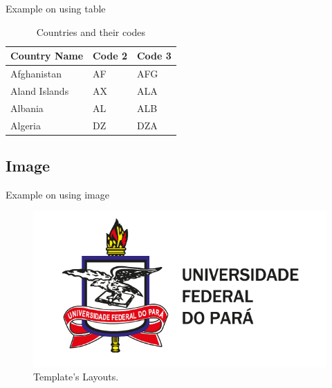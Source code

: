 \documentclass[aspectratio=169,t,xcolor=table]{beamer}
\begin{document}
    \begin{frame}{Example on using table}

        \begin{table}[]
            \centering
            \caption{\label{tab:1}Countries and their codes}

            \renewcommand{\arraystretch}{1.5}
            \setlength{\tabcolsep}{10pt}

            {
                \begin{tabular}{ p{3cm}p{3cm}p{3cm}  }
                    \toprule
                    \textbf{Country Name} & \textbf{Code 2} & \textbf{Code 3} \\
                    \midrule
                    Afghanistan           & AF              & AFG             \\
                    Aland Islands         & AX              & ALA             \\
                    Albania               & AL              & ALB             \\
                    Algeria               & DZ              & DZA             \\
                    \bottomrule
                \end{tabular}
            }
        \end{table}

    \end{frame}

    \subsection{Image}

    \begin{frame}{Example on using image}

        \begin{figure}
            \centering
            \includegraphics[width=.9\textwidth]{lib/logos/Brasao-UFPA-com-descritivo-colorido.png}
            \caption{Template's Layouts.}
            \label{fig:layouts}
        \end{figure}

    \end{frame}
\end{document}
